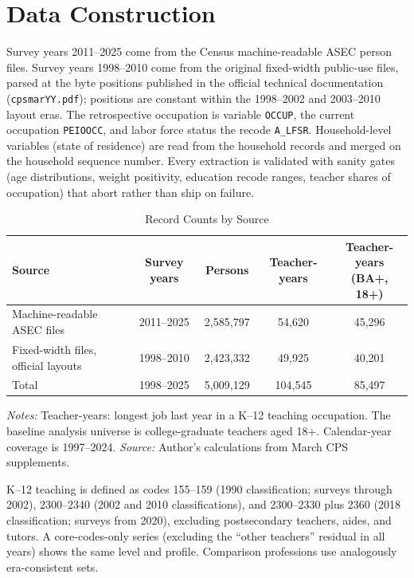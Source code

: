 \documentclass[11pt,a4paper]{article}
\newcommand{\fignote}[1]{\par\vspace{4pt}%
  \begin{minipage}{\linewidth}\footnotesize\color{ecgray}#1\end{minipage}}
\begin{document}
\section{Data Construction}\label{app:construction}

Survey years 2011--2025 come from the Census machine-readable ASEC
person files. Survey years 1998--2010 come from the original
fixed-width public-use files, parsed at the byte positions published
in the official technical documentation (\texttt{cpsmarYY.pdf});
positions are constant within the 1998--2002 and 2003--2010 layout
eras.
The retrospective occupation is variable \texttt{OCCUP}, the current
occupation \texttt{PEIOOCC}, and labor force status the recode
\texttt{A\_LFSR}. Household-level variables (state of residence) are
read from the household records and merged on the household sequence
number. Every
extraction is validated with sanity gates (age distributions, weight
positivity, education recode ranges, teacher shares of occupation) that
abort rather than ship on failure.

\begin{table}[h]
\centering\small
\caption{Record Counts by Source}
\label{tab:sources}
\begin{tabular}{lcccc}
\toprule
Source & Survey years & Persons & Teacher-years & \shortstack{Teacher-years\\(BA+, 18+)} \\
\midrule
Machine-readable ASEC files & 2011--2025 & 2,585,797 & 54,620 & 45,296 \\
Fixed-width files, official layouts & 1998--2010 & 2,423,332 & 49,925 & 40,201 \\
\midrule
Total & 1998--2025 & 5,009,129 & 104,545 & 85,497 \\
\bottomrule
\end{tabular}
\fignote{\textit{Notes:} Teacher-years: longest job last year in a
K--12 teaching occupation. The baseline analysis universe is
college-graduate teachers aged 18+. Calendar-year coverage is
1997--2024. \textit{Source:} Author's calculations from March CPS
supplements.}
\end{table}

K--12 teaching is defined as codes 155--159
(1990 classification; surveys through 2002), 2300--2340 (2002 and 2010
classifications), and 2300--2330 plus 2360 (2018 classification;
surveys from 2020), excluding postsecondary teachers, aides, and
tutors. A core-codes-only series (excluding the ``other teachers''
residual in all years) shows the same level and profile. Comparison
professions use analogously era-consistent sets.
\end{document}
